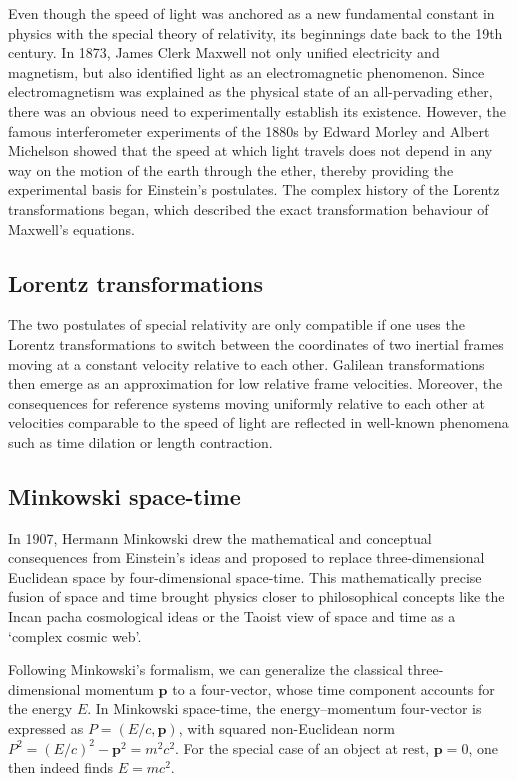 \documentclass{scrartcl}
\begin{document}
Even though the speed of light was anchored as a new fundamental constant in physics with the special theory of relativity, its beginnings date back to the 19th century. In 1873, James Clerk Maxwell not only unified electricity and magnetism, but also identified light as an electromagnetic phenomenon. Since electromagnetism was explained as the physical state of an all-pervading ether, there was an obvious need to experimentally establish its existence. However, the famous interferometer experiments of the 1880s by Edward Morley and Albert Michelson showed that the speed at which light travels does not depend in any way on the motion of the earth through the ether, thereby providing the experimental basis for Einstein's postulates. The complex history of the Lorentz transformations began, which described the exact transformation behaviour of Maxwell's equations.


\subsection*{Lorentz transformations}

The two postulates of special relativity are only compatible if one uses the Lorentz transformations to switch between the coordinates of two inertial frames moving at a constant velocity relative to each other. Galilean transformations then emerge as an approximation for low relative frame velocities. Moreover, the consequences for reference systems moving uniformly relative to each other at velocities comparable to the speed of light are reflected in well-known phenomena such as time dilation or length contraction.


\subsection*{Minkowski space-time}

In 1907, Hermann Minkowski drew the mathematical and conceptual consequences from Einstein's ideas and proposed to replace three-dimensional Euclidean space by four-dimensional space-time. This mathematically precise fusion of space and time brought physics closer to philosophical concepts like the Incan pacha cosmological ideas or the Taoist view of space and time as a \enquote*{complex cosmic web}.

Following Minkowski's formalism, we can generalize the classical three-dimensional momentum $\mathbf{p}$ to a four-vector, whose time component accounts for the energy $E$. In Minkowski space-time, the energy–momentum four-vector is expressed as $P = (E/c, \mathbf{p})$, with squared non-Euclidean norm $P^2=(E/c)^2 - \mathbf{p}^2 = m^2c^2$. For the special case of an object at rest, $\mathbf{p} = 0$, one then indeed finds $E=m c^2$.
\end{document}
